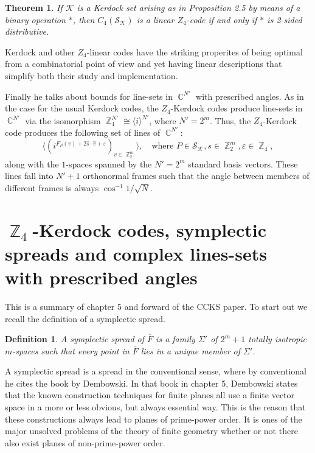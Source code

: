 \documentclass[a4paper]{article}
\DeclareMathOperator{\C}{\mathbb{C}}
\DeclareMathOperator{\Z}{\mathbb{Z}}
\newtheorem{definition}{Definition}
\newtheorem{theorem}{Theorem}
\begin{document}
  \begin{theorem}
    If $\mathcal K$ is a Kerdock set arising as in
    Proposition 2.5 by means of a binary operation $*$, then
    $C_4(\mathcal S_{\mathcal K})$ is a linear $Z_4$-code if
    and only if $*$ is 2-sided distributive.
  \end{theorem}

  Kerdock and other $Z_4$-linear codes have the striking
  properites of being optimal from a combinatorial point of
  view and yet having linear descriptions that simplify both
  their study and implementation.

  Finally he talks about bounds for line-sets in $\C^{N'}$ 
  with prescribed angles. As in the case for the usual
  Kerdock codes, the $Z_4$-Kerdock codes produce line-sets
  in $\C^{N'}$ via the isomorphism $\Z_4^{N'} \cong \langle
  i\rangle^{N'}$, where $N' = 2^{m}$. Thus, the
  $Z_4$-Kerdock code produces the following set of lines of
  $\C^{N'}$:
  \begin{equation}
    \langle \left( 
      i^{F_P(v) + 2 \hat s \cdot \hat v + \varepsilon}
    \right)_{v \in \Z_2^{m}} \rangle,
    \quad
    \text{where }
    P \in \mathcal S_{\mathcal K}, s \in \Z_2^{m},
    \varepsilon \in \Z_4,
  \end{equation}
  along with the $1$-spaces spanned by the $N' = 2^{m}$ 
  standard basis vectors. These lines fall into $N'+1$ 
  orthonormal frames such that the angle between members of
  different frames is always $\cos^{-1} 1 / \sqrt{N}$.

  \section{$\Z_4$-Kerdock codes, symplectic spreads and
  complex lines-sets with prescribed angles}

  This is a summary of chapter 5 and forward of the CCKS
  paper. To start out we recall the definition of a
  symplectic spread.

  \begin{definition}
    A symplectic spread of $\overline{F}$ is a family
    $\Sigma'$ of $2^{m}+1$ totally isotropic $m$-spaces such
    that every point in $\overline{F}$ lies in a unique
    member of $\Sigma'$. 
  \end{definition}

  A symplectic spread is a spread in the conventional sense,
  where by conventional he cites the book by Dembowski. In
  that book in chapter 5, Dembowski states that the known
  construction techniques for finite planes all use a finite
  vector space in a more or less obvious, but always
  essential way. This is the reason that these constructions
  always lead to planes of prime-power order. It is ones of
  the major unsolved problems of the theory of finite
  geometry whether or not there also exist planes of
  non-prime-power order.
\end{document}
